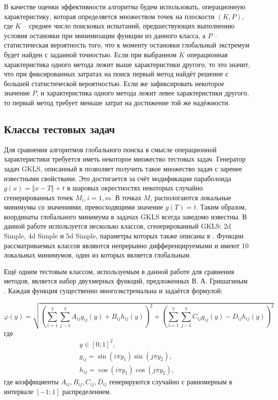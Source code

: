В качестве оценки эффективности алгоритма будем использовать, операционную характеристику,
которая определяется множеством точек на плоскости \((K, P)\),
где \(K\) – среднее число поисковых испытаний, предшествующих выполнению условия
остановки при минимизации функции из данного класса, а \(P\) – статистическая вероятность того,
что к моменту остановки глобальный экстремум будет найден с заданной точностью.
Если при выбранном \(K\) операционная характеристика одного метода лежит выше характеристики другого,
то это значит, что при фиксированных затратах на поиск первый метод найдёт решение с
большей статистической вероятностью. Если же зафиксировать некоторое значение \(P\), и
характеристика одного метода лежит левее характеристики другого, то первый метод
требует меньше затрат на достижение той же надёжности.

\subsection{Классы тестовых задач} \label{subsec:test_problems}
Для сравнения алгоритмов глобального поиска в смысле операционной характеристики
требуется иметь некоторое множество тестовых задач. Генератор задач GKLS, описанный в
\cite{gklsBook} позволяет получить такое множество задач с заренее известными свойствами.
Это достигается за счёт модификации параболоида \(g(x)=\Vert x-T\Vert + t\) в
шаровых окрестностях некоторых случайно сгенерированных точек \(M_i, i=\overline{1,m}\). В точках
\(M_i\) распологаются локальные минимумы со значениями, превосходящими значение
\(g(T)=t\). Таким образом, координаты глобального минимума в задачах GKLS всегда заведомо известны.
В данной работе используется несколько классов, сгенерированный GKLS: 2d Simple, 4d Simple и 5d Simple,
параметры которых также описаны в \cite{gklsBook}. Функции рассматриваемых
классов являются непрерывно дифференцируемыми и имеют 10 локальных минимумов, один из которых является глобальным.

Ещё одним тестовым классом, используемым в данной работе для сравнения методов,
является набор двухмерных функций, предложенных В. А. Гришагиным \cite{grishaginClass}.
Каждая функция существенно многоэкстремальна и задаётся формулой:

\begin{displaymath}
  \varphi(y)=\sqrt{\left(\sum_{i=1}^7\sum_{j-1}^7 A_{ij}g_{ij}(y)+ B_{ij}h_{ij}(y)\right)^2+\left(\sum_{i=1}^7\sum_{j-1}^7 C_{ij}g_{ij}(y) - D_{ij}h_{ij}(y)\right)^2}
\end{displaymath}
где
\begin{displaymath}
  \begin{array}{cr}
    y\in[0;1]^2, \\
    g_{ij}=\sin(i\pi y_1)\sin(j\pi y_2), \\
    h_{ij}=\cos(i\pi y_1)\cos(j\pi y_2),
  \end{array}
\end{displaymath}
где коэффициенты \(A_{ij},B_{ij}, C_{ij}, D_{ij}\) генерируются случайно с равномерным в
интервале \([-1;1]\) распределением.
